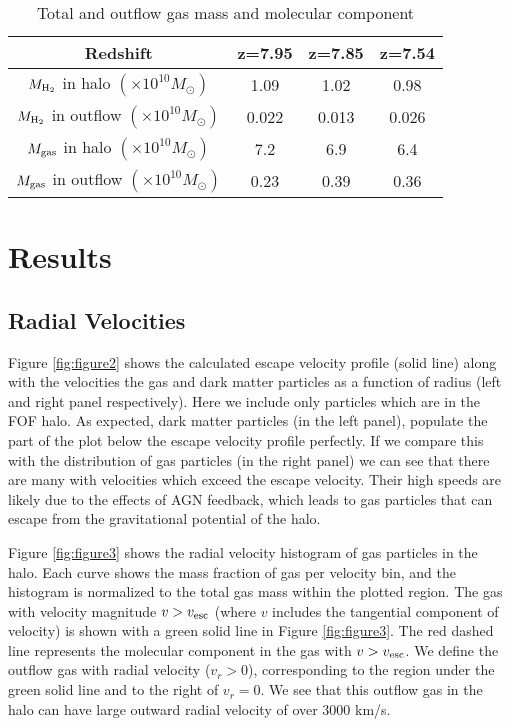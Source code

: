 \documentclass[a4paper,usenatbib]{mnras}
\begin{document}
\begin{table}
\caption{\label{molecular component} Total and outflow gas mass and molecular component}
\begin{tabular}{|c|c|c|c|}
\hline
 Redshift & z=7.95 & z=7.85 & z=7.54\\
\hline
$M_{\rm{H}_{2}}$ in halo $(\times 10^{10} M_{\odot})$ & 1.09 & 1.02 & 0.98 \\
$M_{\rm{H}_{2}}$ in outflow $(\times 10^{10} M_{\odot})$ & 0.022 & 0.013 & 0.026 \\
$M_{\rm gas}$ in halo $(\times 10^{10} M_{\odot})$ & 7.2 & 6.9 & 6.4 \\
$M_{\rm gas}$ in outflow $(\times 10^{10} M_{\odot})$ & 0.23 & 0.39 & 0.36 \\
\hline
\end{tabular}
\end{table}

\section{Results}

\subsection{Radial Velocities}
Figure \ref{fig:figure2} shows the calculated escape velocity profile  (solid line) along with the velocities the gas and dark matter particles as a function of radius (left and right panel respectively). Here we include only  particles which are in the FOF halo. As expected, 
dark matter particles (in the left panel), populate the part of the plot below the escape velocity
profile perfectly. If we compare this with the distribution of gas particles (in the right panel) we can see that there are many with velocities which exceed the escape velocity. Their high speeds are likely due to the effects
of AGN feedback, which leads to gas particles that can escape from the gravitational potential of the halo. \citep{Costa,Biernacki,Barai2018} 

Figure \ref{fig:figure3} shows the radial velocity histogram of gas particles in the halo. 
Each curve shows the mass fraction of gas per velocity bin, and the histogram is normalized to the total gas mass within the plotted region.
The gas with velocity magnitude $v > v_{\rm esc}$ (where $v$ includes the tangential component of velocity) is shown with a green solid line in Figure \ref{fig:figure3}. 
The red dashed line represents the molecular component in the gas with $v > v_{\rm esc}$. 
We define the outflow gas with radial velocity  ($v_{r} > 0$), corresponding to the region under the green solid line and to the right of $v_r=0$. 
We see that this outflow gas in the halo can have large outward radial velocity of over 3000 km/s.  
\end{document}
